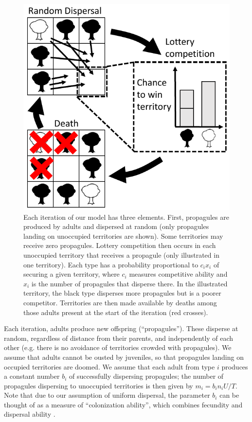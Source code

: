 \documentclass[11pt]{article}
\begin{document}
\begin{figure}
\centering
\includegraphics[scale=0.8]{lottery.pdf}
\caption{\label{fig:lottery} Each iteration of our model has three elements. First, propagules are produced by adults and dispersed at random (only propagules landing on unoccupied territories are shown). Some territories may receive zero propagules. Lottery competition then occurs in each unoccupied territory that receives a propagule (only illustrated in one territory). Each type has a probability proportional to $c_i x_i$ of securing a given territory, where $c_i$ measures competitive ability and $x_i$ is the number of propagules that disperse there. In the illustrated territory, the black type disperses more propagules but is a poorer competitor. Territories are then made available by deaths among those adults present at the start of the iteration (red crosses).}
\end{figure}

Each iteration, adults produce new offspring (``propagules''). These disperse at random, regardless of distance from their parents, and independently of each other (e.g. there is no avoidance of territories crowded with propagules). We assume that adults cannot be ousted by juveniles, so that propagules landing on occupied territories are doomed. We assume that each adult from type $i$ produces a constant number $b_i$ of successfully dispersing propagules; the number of propagules dispersing to unoccupied territories is then given by $m_i=b_in_iU/T$. Note that due to our assumption of uniform dispersal, the parameter $b_i$ can be thought of as a measure of ``colonization ability'', which combines fecundity and dispersal ability \citep{levins_71,tilman_94,bolker_99}. 
\end{document}
